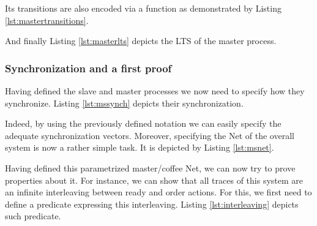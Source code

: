 	\noindent Its transitions are also encoded via a function as demonstrated by 
	Listing \ref{lst:mastertransitions}.
	
				
	
	\noindent And finally Listing \ref{lst:masterlts} depicts the \textsf{LTS} of the master process.
	
	
						
	
	
	\noindent 	
	
	
\subsubsection{Synchronization and a first proof}	
\label{subsub:synch}	
	
	
	Having defined the slave and master processes we now need to specify how they synchronize.
	Listing \ref{lst:mssynch}	depicts their synchronization.	
	
						
	
	\noindent Indeed, by using the previously defined notation we can easily specify
	the adequate synchronization vectors. Moreover, specifying the \textsf{Net} of the
	overall system is now a rather simple task.	
	It is depicted by Listing \ref{lst:msnet}.

				

	\noindent Having defined this parametrized master/coffee \textsf{Net}, we can
	now try to prove properties about it. For instance, we can show that all traces
	of this system are an infinite interleaving between \textsf{ready} and \textsf{order}
	\textsf{actions}. For this, we first need to define a predicate expressing
	this interleaving. Listing \ref{lst:interleaving} depicts such predicate.

